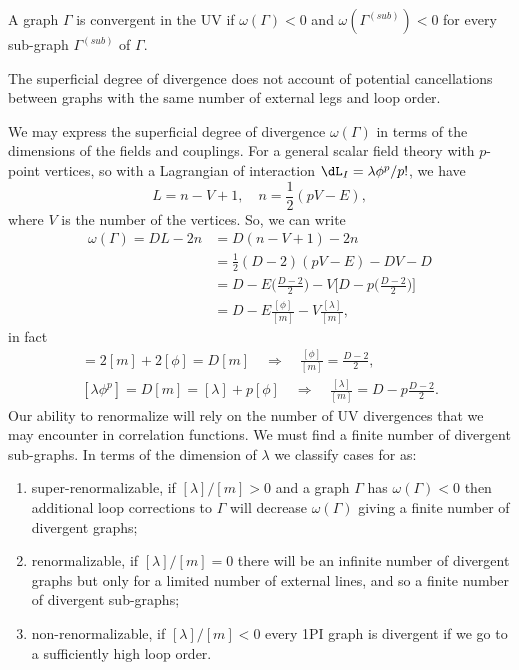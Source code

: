 \begin{teo} 
    A graph $\Gamma$ is convergent in the UV if $\omega(\Gamma) < 0$ and $\omega(\Gamma^{(sub)}) < 0$ for every sub-graph $\Gamma^{(sub)}$ of $\Gamma$.
\end{teo}
\begin{obs}
    The superficial degree of divergence does not account of potential cancellations between graphs with the same number of external legs and loop order.  
\end{obs}
We may express the superficial degree of divergence $\omega(\Gamma)$ in terms of the dimensions of the fields and couplings. For a general scalar field theory with $p$-point vertices, so with a Lagrangian of interaction $\dL_I = \lambda\phi^p/p!$, we have
\begin{equation}
    L = n - V + 1,\quad n = \frac{1}{2}(pV - E),
\end{equation}
where $V$ is the number of the vertices. So, we can write
\begin{equation}
    \begin{split}
    \omega(\Gamma) = DL - 2n &= D(n - V + 1) - 2n \\
    &= \frac{1}{2}(D - 2)(pV - E) - DV - D \\
    &= D - E\bigg(\frac{D - 2}{2}\bigg) - V\bigg[D - p\bigg(\frac{D - 2}{2}\bigg)\bigg] \\
    &= D - E\frac{[\phi]}{[m]} - V\frac{[\lambda]}{[m]},
    \end{split}
\end{equation}
in fact
\begin{gather}
    [m^2\phi^2] = 2[m] + 2[\phi] = D[m] \quad\Longrightarrow\quad \frac{[\phi]}{[m]} = \frac{D - 2}{2}, \\
    [\lambda\phi^p] = D[m] = [\lambda] + p[\phi] \quad\Longrightarrow\quad \frac{[\lambda]}{[m]} = D - p\frac{D - 2}{2}.
\end{gather}
Our ability to renormalize will rely on the number of UV divergences that we may encounter in correlation functions. We must find a finite number of divergent sub-graphs. In terms of the dimension of $\lambda$ we classify cases for as:
\begin{enumerate}
    \item super-renormalizable, if $[\lambda]/[m] > 0$ and a graph $\Gamma$ has $\omega(\Gamma) < 0$ then additional loop corrections to $\Gamma$ will decrease $\omega(\Gamma)$ giving a finite number of divergent graphs;
    \item renormalizable, if $[\lambda]/[m] = 0$ there will be an infinite number of divergent graphs but only for a limited number of external lines, and so a finite number of divergent sub-graphs;
    \item non-renormalizable, if $[\lambda]/[m] < 0$ every 1PI graph is divergent if we go to a sufficiently high loop order.
\end{enumerate}
